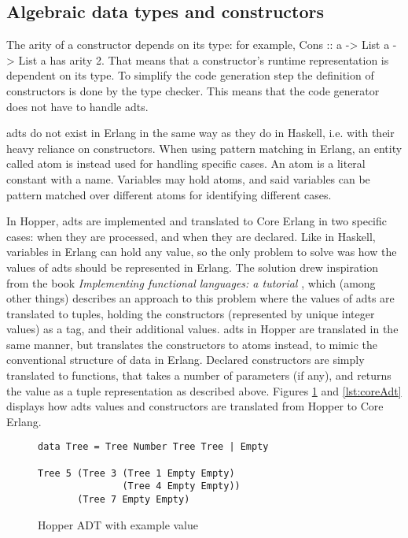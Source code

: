 \subsection{Algebraic data types and constructors}

The arity of a constructor depends on its type: for example, Cons :: a -> List a -> List a has arity 2. That means that a constructor's runtime representation is dependent on its type.
To simplify the code generation step the definition of constructors is done by the type checker. This means that the code generator does not have to handle \glspl{adt}. 

\Glspl{adt} do not exist in Erlang in the same way as they do in Haskell, i.e. with their heavy reliance on constructors. When using pattern matching in Erlang, an entity called atom is instead used for handling specific cases. An atom is a literal constant with a name. Variables may hold atoms, and said variables can be pattern matched over different atoms for identifying different cases.

In Hopper, \glspl{adt} are implemented and translated to Core Erlang in two specific cases: when they are processed, and when they are declared. Like in Haskell, variables in Erlang can
hold any value, so the only problem to solve was how the values of \glspl{adt} should be represented in Erlang. The solution drew inspiration from the book \textit{Implementing functional languages: a tutorial} \cite{FunTutorial}, which (among other things) describes an approach to this problem where the values of \glspl{adt} are translated to tuples, holding the constructors (represented by unique integer values) as a tag, and their additional values. \Glspl{adt} in Hopper are translated in the same manner, but translates the constructors to atoms instead, to mimic the conventional structure of data in Erlang. Declared constructors are simply translated to functions, that takes a number of parameters (if any), and returns the value as a tuple representation as described above. Figures \ref{lst:hopperAdt} and \ref{lst:coreAdt} displays how \glspl{adt} values and constructors are translated from Hopper to Core Erlang.

\begin{figure}[!htb]
\centering
\begin{lstlisting} 
data Tree = Tree Number Tree Tree | Empty

Tree 5 (Tree 3 (Tree 1 Empty Empty) 
               (Tree 4 Empty Empty)) 
       (Tree 7 Empty Empty)
\end{lstlisting}
\caption{Hopper ADT with example value}
\label{lst:hopperAdt}
\end{figure}


